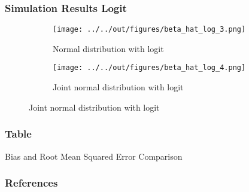 \documentclass{beamer}
\begin{document}
\begin{frame}[t]
    \frametitle{Simulation Results Logit}

	\begin{figure}
	\caption{Simulation results: comparison between normal and joint normal distribution of error term}
	\centering
	\begin{subfigure}{.5\textwidth}
 	 \centering
  	\texttt{[image: ../../out/figures/beta\_hat\_log\_3.png]}
  	\caption{Normal distribution with logit}
	\end{subfigure}%
	\begin{subfigure}{.5\textwidth}
 	 \centering
  	\texttt{[image: ../../out/figures/beta\_hat\_log\_4.png]}
  	\caption{Joint normal distribution with logit}
	\end{subfigure}%
	\end{figure}


\end{frame}


\begin{frame}[t]
    \frametitle{Table}

\begin{table}
\centering
{}
\caption {Bias and Root Mean Squared Error Comparison} \label{tab:bias and mean squared error}

\end{table}

    \note{~}
\end{frame}


\begin{frame}[allowframebreaks]
    \frametitle{References}
    \renewcommand{\bibfont}{\normalfont\footnotesize}
    \printbibliography
\end{frame}
\end{document}

